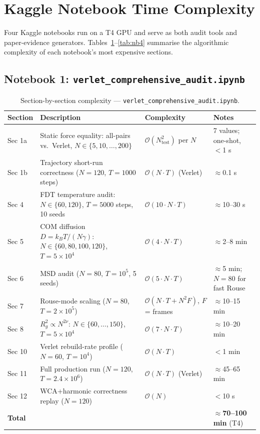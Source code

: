 \documentclass[12pt,a4paper]{article}
\newcommand{\Obig}[1]{\mathcal{O}\!\left(#1\right)}
\begin{document}
\section{Kaggle Notebook Time Complexity}
\label{sec:nb-complexity}

Four Kaggle notebooks run on a T4 GPU and serve as both audit tools and
paper-evidence generators.  Tables~\ref{tab:nb1}--\ref{tab:nb4} summarise the
algorithmic complexity of each notebook's most expensive sections.

\subsection{Notebook 1: \texttt{verlet\_comprehensive\_audit.ipynb}}

\begin{table}[h]
\centering
\caption{Section-by-section complexity — \texttt{verlet\_comprehensive\_audit.ipynb}.}
\label{tab:nb1}
\begin{tabular}{p{1.2cm}p{4.5cm}p{3cm}p{4cm}}
\toprule
Section & Description & Complexity & Notes \\
\midrule
Sec 1a & Static force equality: all-pairs vs.\ Verlet, $N\in\{5,10,\ldots,200\}$
        & $\Obig{N_\text{test}^2}$ per $N$
        & 7 values; one-shot, $<$1 s \\
Sec 1b & Trajectory short-run correctness ($N=120$, $T=1000$ steps)
        & $\Obig{N\cdot T}$ (Verlet)
        & $\approx$0.1 s \\
Sec 4  & FDT temperature audit: $N\in\{60,120\}$, $T=5000$ steps, 10 seeds
        & $\Obig{10\cdot N\cdot T}$
        & $\approx$10--30 s \\
Sec 5  & COM diffusion $D=k_BT/(N\gamma)$: $N\in\{60,80,100,120\}$, $T=5\times10^4$
        & $\Obig{4\cdot N\cdot T}$
        & $\approx$2--8 min \\
Sec 6  & MSD audit ($N=80$, $T=10^5$, 5 seeds)
        & $\Obig{5\cdot N\cdot T}$
        & $\approx$5 min; $N=80$ for fast Rouse \\
Sec 7  & Rouse-mode scaling ($N=80$, $T=2\times10^5$)
        & $\Obig{N\cdot T + N^2 F}$, $F$ = frames
        & $\approx$10--15 min \\
Sec 8  & $R_g^2 \propto N^{2\nu}$: $N\in\{60,\ldots,150\}$, $T=5\times10^4$
        & $\Obig{7\cdot N\cdot T}$
        & $\approx$10--20 min \\
Sec 10 & Verlet rebuild-rate profile ($N=60$, $T=10^4$)
        & $\Obig{N\cdot T}$
        & $<$1 min \\
Sec 11 & Full production run ($N=120$, $T=2.4\times10^6$)
        & $\Obig{N\cdot T}$ (Verlet)
        & $\approx$45--65 min \\
Sec 12 & WCA+harmonic correctness replay ($N=120$)
        & $\Obig{N}$
        & $<$10 s \\
\midrule
\textbf{Total} & & & $\approx$\textbf{70--100 min} (T4) \\
\bottomrule
\end{tabular}
\end{table}
\end{document}
